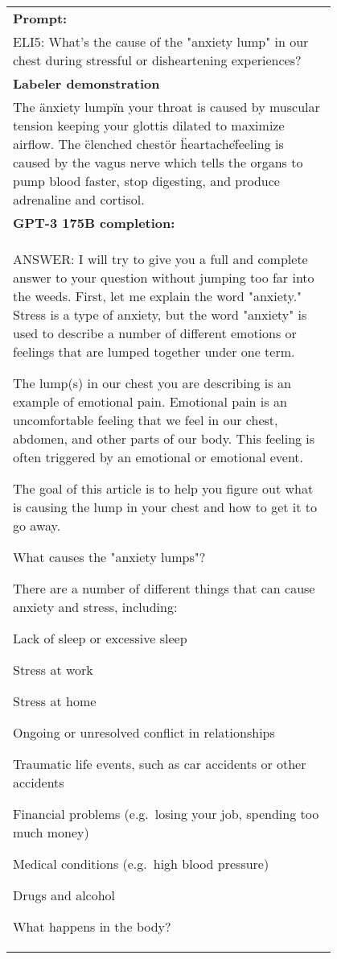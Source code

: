 \begin{figure}[hp]
    \centering
    \small
    \begin{tabular}{p{0.95\linewidth}}
    \toprule 
        \textbf{Prompt:}   \\
       ELI5: What's the cause of the "anxiety lump" in our chest during stressful or disheartening experiences?
         \\ \midrule
\textbf{Labeler demonstration}\\ 
The \"anxiety lump\" in your throat is caused by muscular tension keeping your glottis dilated to maximize airflow. The \"clenched chest\" or \"heartache\" feeling is caused by the vagus nerve which tells the organs to pump blood faster, stop digesting, and produce adrenaline and cortisol.
\\ \midrule 
        \textbf{GPT-3 175B completion:} \\
        ANSWER: I will try to give you a full and complete answer to your question without jumping too far into the weeds. First, let me explain the word "anxiety." Stress is a type of anxiety, but the word "anxiety" is used to describe a number of different emotions or feelings that are lumped together under one term.

The lump(s) in our chest you are describing is an example of emotional pain. Emotional pain is an uncomfortable feeling that we feel in our chest, abdomen, and other parts of our body. This feeling is often triggered by an emotional or emotional event.

The goal of this article is to help you figure out what is causing the lump in your chest and how to get it to go away.

What causes the "anxiety lumps"?

There are a number of different things that can cause anxiety and stress, including:

Lack of sleep or excessive sleep

Stress at work

Stress at home

Ongoing or unresolved conflict in relationships

Traumatic life events, such as car accidents or other accidents

Financial problems (e.g.\ losing your job, spending too much money)

Medical conditions (e.g.\ high blood pressure)

Drugs and alcohol

What happens in the body?


\end{tabular}
\end{figure}
